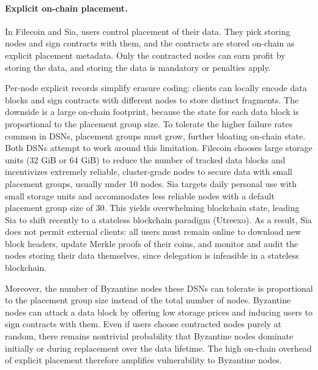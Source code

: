 \iffalse
\paragraph{Explicit on-chain placement.}
In Filecoin and Sia, users control placement of their data.
They pick storing nodes and sign contracts with them, and the contracts are stored on-chain as explicit placement metadata.
Only the contracted nodes can earn profit by storing the data, and storing the data is mandatory or penalties apply.

Per-node explicit records simplify erasure coding: clients can locally encode data blocks and sign contracts with different nodes to store distinct fragments.
The downside is a large on-chain footprint, because the state for each data block is proportional to the placement group size.
To tolerate the higher failure rates common in DSNs, placement groups must grow, further bloating on-chain state.
Both DSNs attempt to work around this limitation.
Filecoin chooses large storage units (32 GiB or 64 GiB) to reduce the number of tracked data blocks and incentivizes extremely reliable, cluster-grade nodes to secure data with small placement groups, usually under 10 nodes.
Sia targets daily personal use with small storage units and accommodates less reliable nodes with a default placement group size of 30.
This yields overwhelming blockchain state, leading Sia to shift recently to a stateless blockchain paradigm (Utreexo).
As a result, Sia does not permit external clients: all users must remain online to download new block headers, update Merkle proofs of their coins, and monitor and audit the nodes storing their data themselves, since delegation is infeasible in a stateless blockchain.

Moreover, the number of Byzantine nodes these DSNs can tolerate is proportional to the placement group size instead of the total number of nodes.
Byzantine nodes can attack a data block by offering low storage prices and inducing users to sign contracts with them.
Even if users choose contracted nodes purely at random, there remains nontrivial probability that Byzantine nodes dominate initially or during replacement over the data lifetime.
The high on-chain overhead of explicit placement therefore amplifies vulnerability to Byzantine nodes.

